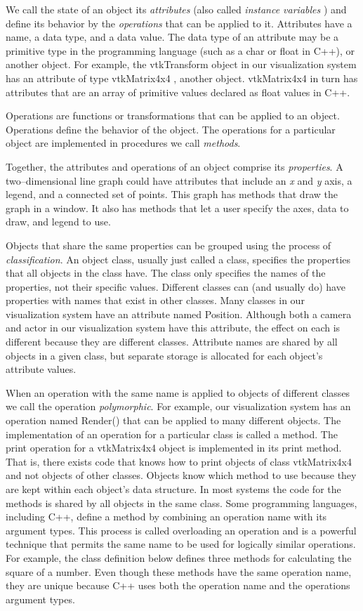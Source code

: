 We call the state of an object its \emph{attributes} (also called \emph{instance variables} ) and define its behavior by the \emph{operations} that can be applied to it. Attributes have a name, a data type, and a data value. The data type of an attribute may be a primitive type in the programming language (such as a char or float in C++), or another object. For example, the vtkTransform object in our visualization system has an attribute of type vtkMatrix4x4 , another object. vtkMatrix4x4 in turn has attributes that are an array of primitive values declared as float values in C++.

Operations are functions or transformations that can be applied to an object. Operations define the behavior of the object. The operations for a particular object are implemented in procedures we call \emph{methods}.

Together, the attributes and operations of an object comprise its \emph{properties}. A two--dimensional line graph could have attributes that include an \emph{x} and \emph{y} axis, a legend, and a connected set of points. This graph has methods that draw the graph in a window. It also has methods that let a user specify the axes, data to draw, and legend to use.

Objects that share the same properties can be grouped using the process of \emph{classification}. An object class, usually just called a class, specifies the properties that all objects in the class have. The class only specifies the names of the properties, not their specific values. Different classes can (and usually do) have properties with names that exist in other classes. Many classes in our visualization system have an attribute named Position. Although both a camera and actor in our visualization system have this attribute, the effect on each is different because they are different classes. Attribute names are shared by all objects in a given class, but separate storage is allocated for each object's attribute values.

When an operation with the same name is applied to objects of different classes we call the operation \emph{polymorphic}. For example, our visualization system has an operation named Render() that can be applied to many different objects. The implementation of an operation for a particular class is called a method. The print operation for a vtkMatrix4x4 object is implemented in its print method. That is, there exists code that knows how to print objects of class vtkMatrix4x4 and not objects of other classes. Objects know which method to use because they are kept within each object's data structure. In most systems the code for the methods is shared by all objects in the same class. Some programming languages, including C++, define a method by combining an operation name with its argument types. This process is called overloading an operation and is a powerful technique that permits the same name to be used for logically similar operations. For example, the class definition below defines three methods for calculating the square of a number. Even though these methods have the same operation name, they are unique because C++ uses both the operation name and the operations argument types.

